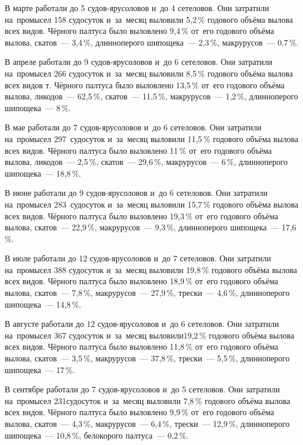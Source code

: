 В марте работали до 5 судов-ярусоловов и~до 4 сетеловов. Они затратили на~промысел 158 судосуток и~за~месяц выловили 5,2\,\% годового объёма вылова всех видов. Чёрного палтуса было выловлено 9,4\,\% от~его годового объёма вылова, скатов~--- 3,4\,\%, длинноперого шипощека~--- 2,3\,\%, макрурусов~--- 0,7\,\%.

В апреле работали до 9 судов-ярусоловов и~до 6 сетеловов. Они затратили на~промысел 266 судосуток и~за~месяц выловили 8,5\,\% годового объёма вылова всех видов т. Чёрного палтуса было выловлено 13,5\,\% от~его годового объёма вылова, ликодов~--- 62,5\,\%, скатов~--- 11,5\,\%, макрурусов~--- 1,2\,\%, длинноперого шипощека~--- 8\,\%.

В мае работали до 7 судов-ярусоловов и~до 6 сетеловов. Они затратили на~промысел 297~судосуток и~за~месяц выловили 11,5\,\% годового объёма вылова всех видов. Чёрного палтуса было выловлено 11\,\% от~его годового объёма вылова, ликодов~--- 2,5\,\%, скатов~--- 29,6\,\%, макрурусов~--- 6\,\%, длинноперого шипощека~--- 18,8\,\%.

В июне работали до 9 судов-ярусоловов и~до 6 сетеловов. Они затратили на~промысел 283~судосуток и~за~месяц выловили 15,7\,\% годового объёма вылова всех видов. Чёрного палтуса было выловлено 19,3\,\% от~его годового объёма вылова, скатов~--- 22,9\,\%, макрурусов~--- 9,3\,\%, длинноперого шипощека~--- 17,6\,\%.

В июле работали до 12 судов-ярусоловов и~до 7 сетеловов. Они затратили на~промысел 388 судосуток и~за~месяц выловили 19,8\,\% годового объёма вылова всех видов. Чёрного палтуса было выловлено 18,9\,\% от~его годового объёма вылова, скатов~--- 7,8\,\%, макрурусов~--- 27,9\,\%, трески~--- 4,6\,\%, длинноперого шипощека~--- 14,8\,\%.

В августе работали до 12 судов-ярусоловов и~до 6 сетеловов. Они затратили на~промысел 367 судосуток и~за~месяц выловили19,2\,\% годового объёма вылова всех видов. Чёрного палтуса было выловлено 11,8\,\% от~его годового объёма вылова, скатов~--- 3,5\,\%, макрурусов~--- 37,8\,\%, трески~--- 5,5\,\%, длинноперого шипощека~--- 17\,\%.

В сентябре работали до 7 судов-ярусоловов и~до 5 сетеловов. Они затратили на~промысел 231судосуток и~за~месяц выловили 7,8\,\% годового объёма вылова всех видов. Чёрного палтуса было выловлено 9,9\,\% от~его годового объёма вылова, скатов~--- 4,3\,\%, макрурусов~--- 6,4\,\%, трески~--- 12,9\,\%, длинноперого шипощека~--- 10,8\,\%, белокорого палтуса~--- 0,2\,\%.


